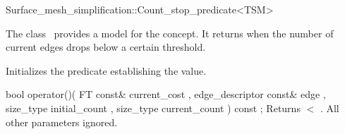 

\begin{ccRefClass}{Surface_mesh_simplification::Count_stop_predicate<TSM>}


\ccDefinition

The class \ccRefName\ provides a model for the  concept.
It returns  when the number of current edges drops below a certain threshold.


\ccIsModel
{}

\ccCreation
{}  %

{Initializes the predicate establishing the  value.} 

\ccOperations

  \ccMethod
    {bool operator()( FT const&              current_cost
                    , edge_descriptor const& edge
                    , size_type              initial_count
                    , size_type              current_count
                    ) const ;
           }
  {Returns  $<$ . All other parameters ignored.}

\ccSeeAlso
{}

\end{ccRefClass}


